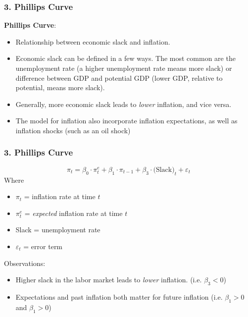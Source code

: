 \documentclass{beamer}
\begin{document}
\begin{frame}[t]
    \frametitle{3. Phillips Curve}

\textbf{Phillips Curve}: 
\begin{itemize}
    \item Relationship between economic slack and inflation.
    \item Economic slack can be defined in a few ways.  The most common are the unemployment rate (a higher unemployment rate means more slack) or difference between GDP and potential GDP (lower GDP, relative to potential, means more slack).
    \item Generally, more economic slack leads to \textit{lower} inflation, and vice versa.
    \item The model for inflation also incorporate inflation expectations, as well as inflation shocks (such as an oil shock)
\end{itemize}

\end{frame}

\begin{frame}[t]
    \frametitle{3. Phillips Curve}

    $$\pi_t = \beta_0 \cdot \pi_t^e + \beta_1 \cdot \pi_{t-1} + \beta_3 \cdot \text{(Slack)}_t + \varepsilon_t$$
    Where
    \begin{itemize}
        \item $\pi_t$ = inflation rate at time $t$
        \item $\pi_t^e$ = \textit{expected} inflation rate at time $t$
        \item Slack = unemployment rate
        \item $\varepsilon_t$ = error term
    \end{itemize}
    Observations:

    \begin{itemize}
        \item  Higher slack in the labor market leads to \textit{lower} inflation.  (i.e. $\beta_3 < 0$)
        \item Expectations and past inflation both matter for future inflation (i.e. $\beta_1 > 0$ and $\beta_1 > 0$)
    \end{itemize}

\end{frame}
\end{document}

